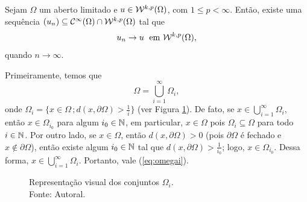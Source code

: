 \begin{tbox} \label{thm:aprox-2}
    Sejam $\Omega$ um aberto limitado e $u \in \mathcal{W}^{k,p}(\Omega)$, com $1 \leqslant p < \infty$.
    Então, existe uma sequência $(u_n) \subseteq \mathcal{C}^{\infty}(\Omega) \cap \mathcal{W}^{k,p}(\Omega)$ tal que
    \[
        u_n \to u \;\text{ em } \mathcal{W}^{k,p}(\Omega),
    \] 
    quando $n \to \infty$.
\end{tbox}
\begin{prf}
    Primeiramente, temos que
    \begin{equation} \label{eq:omegai}
        \Omega = \bigcup_{i=1}^\infty \Omega_i,
    \end{equation}
    onde $\Omega_i = \{x \in \Omega \,; d(x, \partial\Omega) > \tfrac{1}{i}\}$ (ver Figura \ref{fig:omegai}). De fato,
    se $x \in \bigcup_{i=1}^\infty \Omega_i$, então $x \in \Omega_{i_0}$ para algum $i_0 \in \mathbb{N}$, em particular, $x \in \Omega$ pois $\Omega_i \subseteq \Omega$ para todo $i \in \mathbb{N}$.
    Por outro lado, se $x \in \Omega$, então $d(x,\partial \Omega) > 0$ (pois $\partial\Omega$ é fechado e $x \not\in \partial\Omega$), então existe algum $i_0 \in \mathbb{N}$ tal que $d(x, \partial \Omega) > \frac{1}{i_0}$; logo, $x \in \Omega_{i_0}$. Dessa forma, $x \in \bigcup_{i=1}^\infty \Omega_i$.
    Portanto, vale (\ref{eq:omegai}). 
    \begin{figure}
        \centering
        
        \caption{Representação visual dos conjuntos $\Omega_i$.\\Fonte: Autoral.}
        \label{fig:omegai}
    \end{figure}
    

\end{prf}
